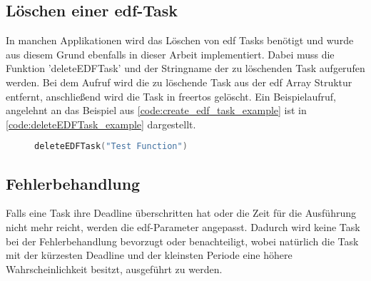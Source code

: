 \documentclass[../EDF Master Thesis.tex]{subfiles}
\begin{document}
\subsection{Löschen einer \acf{edf}-Task} \label{section:löschen_einer_edf_task}

    In manchen Applikationen wird das Löschen von \ac{edf} Tasks benötigt und wurde aus diesem Grund ebenfalls in dieser Arbeit implementiert.
    Dabei muss die Funktion 'deleteEDFTask' und der Stringname der zu löschenden Task aufgerufen werden.
    Bei dem Aufruf wird die zu löschende Task aus der \ac{edf} Array Struktur entfernt, anschließend wird die Task in \ac{freertos} gelöscht.
    Ein Beispielaufruf, angelehnt an das Beispiel aus \autoref{code:create_edf_task_example} ist in \autoref{code:deleteEDFTask_example} dargestellt.

\begin{figure}[ht!]
\begin{lstlisting}[language=C, caption=deleteEDFTask Beispiel, label=code:deleteEDFTask_example]
    deleteEDFTask("Test Function")
\end{lstlisting}
\end{figure}

\subsection{Fehlerbehandlung} \label{section:Fehlerbehandlung}

    Falls eine Task ihre Deadline überschritten hat oder die Zeit für die Ausführung nicht mehr reicht, werden die \ac{edf}-Parameter angepasst.
    Dadurch wird keine Task bei der Fehlerbehandlung bevorzugt oder benachteiligt, wobei natürlich die Task mit der kürzesten Deadline und der kleinsten Periode eine höhere Wahrscheinlichkeit besitzt, ausgeführt zu werden. 
\end{document}

